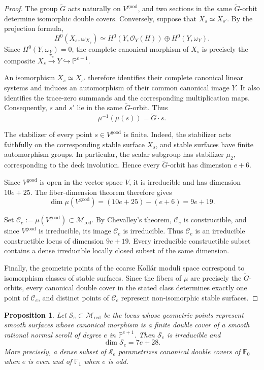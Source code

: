 \documentclass[11pt,twoside]{amsart}
\theoremstyle{plain}
\numberwithin{equation}{section}
\newtheorem{proposition}[theorem]{Proposition}
\theoremstyle{definition}
\begin{document}
\begin{proof}
The group $\widetilde G$ acts naturally on $V^{\mathrm{good}}$, and two sections in the same $\widetilde G$-orbit determine isomorphic double covers. Conversely, suppose that $X_s\simeq X_{s'}$. By the projection formula,
$$
H^0(X_s,\omega_{X_s})
\simeq H^0(Y,\mathcal O_Y(H))\oplus H^0(Y,\omega_Y).
$$
Since $H^0(Y,\omega_Y)=0$, the complete canonical morphism of $X_s$ is precisely the composite $X_s\xrightarrow{\pi_s}Y\hookrightarrow\mathbb P^{e+1}$.

An isomorphism $X_s\simeq X_{s'}$ therefore identifies their complete canonical linear systems and induces an automorphism of their common canonical image $Y$. It also identifies the trace-zero summands and the corresponding multiplication maps. Consequently, $s$ and $s'$ lie in the same $\widetilde G$-orbit. Thus
$$
\mu^{-1}(\mu(s))=\widetilde G\cdot s.
$$

The stabilizer of every point $s\in V^{\mathrm{good}}$ is finite. Indeed, the stabilizer acts faithfully on the corresponding stable surface $X_s$, and stable surfaces have finite automorphism groups. In particular, the scalar subgroup has stabilizer $\mu_2$, corresponding to the deck involution. Hence every $\widetilde G$-orbit has dimension $e+6$.

Since $V^{\mathrm{good}}$ is open in the vector space $V$, it is irreducible and has dimension $10e+25$. The fiber-dimension theorem therefore gives
$$
\dim\mu(V^{\mathrm{good}})
=(10e+25)-(e+6)=9e+19.
$$

Set $\mathcal C_e:=\mu(V^{\mathrm{good}})\subset\mathcal M_{\mathrm{red}}$. By Chevalley's theorem, $\mathcal C_e$ is constructible, and since $V^{\mathrm{good}}$ is irreducible, its image $\mathcal C_e$ is irreducible. Thus $\mathcal C_e$ is an irreducible constructible locus of dimension $9e+19$. Every irreducible constructible subset contains a dense irreducible locally closed subset of the same dimension.

Finally, the geometric points of the coarse Kollár moduli space correspond to isomorphism classes of stable surfaces. Since the fibers of $\mu$ are precisely the $\widetilde G$-orbits, every canonical double cover in the stated class determines exactly one point of $\mathcal C_e$, and distinct points of $\mathcal C_e$ represent non-isomorphic stable surfaces.
\end{proof}

\begin{proposition}\label{prop:dimension-canonical-covers-smooth-scrolls}
Let $\mathcal S_e\subset\mathcal M_{\mathrm{red}}$ be the locus whose geometric points represent smooth surfaces whose canonical morphism is a finite double cover of a smooth rational normal scroll of degree $e$ in $\mathbb P^{e+1}$. Then $\mathcal S_e$ is irreducible and
$$
\dim\mathcal S_e=7e+28.
$$
More precisely, a dense subset of $\mathcal S_e$ parametrizes canonical double covers of $\mathbb F_0$ when $e$ is even and of $\mathbb F_1$ when $e$ is odd.
\end{proposition}
\end{document}
